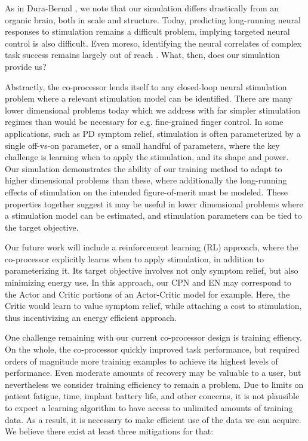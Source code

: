 \documentclass[12pt]{iopart}
\begin{document}
As in Dura-Bernal \cite{bernal.sim}, we note that our simulation differs drastically from an
organic brain, both in scale and structure. Today, predicting long-running
neural responses to stimulation remains a difficult problem, implying targeted neural control
is also difficult. Even moreso, identifying the neural correlates of complex task success
remains largely out of reach \cite{khanna.openloop}. What, then, does our simulation provide us?

Abstractly, the co-processor lends itself to any closed-loop neural stimulation problem
where a relevant stimulation model can be identified. There are many lower dimensional problems
today which we address with far simpler stimulation regimes than would be necessary for
e.g. fine-grained finger control. In some applications, such as PD symptom relief,
stimulation is often parameterized by a single off-vs-on parameter, or a small handful of
parameters, where the key challenge is learning when to apply the stimulation, and
its shape and power. Our simulation demonstrates the ability of our training method to
adapt to higher dimensional problems than these, where additionally the long-running
effects of stimulation on the intended figure-of-merit must be modeled. These properties
together suggest it may be useful in lower dimensional problems where a stimulation model
can be estimated, and stimulation parameters can be tied to the target objective.

Our future work will include a reinforcement learning (RL) approach, where the co-processor
explicitly learns when to apply stimulation, in addition to parameterizing it. Its target
objective involves not only symptom relief, but also minimizing energy use. In this approach,
our CPN and EN may correspond to the Actor and Critic portions of an Actor-Critic model
for example. Here, the Critic would learn to value symptom relief, while attaching a cost
to stimulation, thus incentivizing an energy efficient approach.

One challenge remaining with our current co-processor design is training effiency.
On the whole, the co-processor quickly improved task performance, but required orders of
magnitude more training examples to achieve its highest levels of performance. Even
moderate amounts of recovery may be valuable to a user, but nevertheless we consider
training efficiency to remain a problem. Due to limits on patient fatigue, time, implant
battery life, and other concerns, it is not plausible to expect a learning algorithm
to have access to unlimited amounts of training data. As a result, it is necessary to
make efficient use of the data we can acquire. We believe there exist at least three
mitigations for that:
\end{document}

